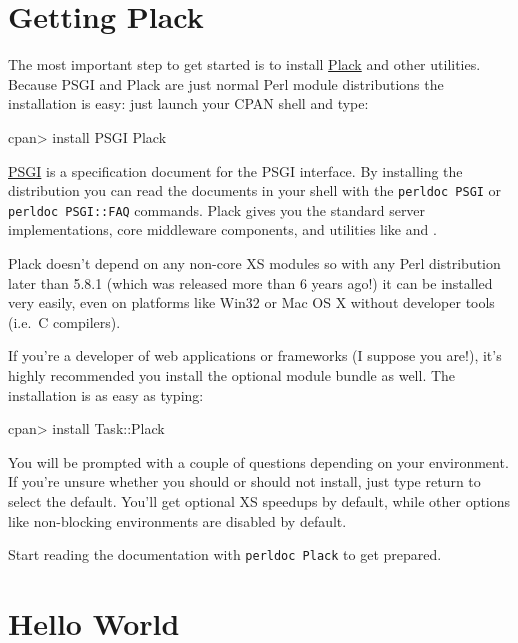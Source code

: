 \chapter{Getting Plack}\label{day-1-getting-plack}

The most important step to get started is to install
\href{http://search.cpan.org/dist/Plack}{Plack} and other utilities.
Because PSGI and Plack are just normal Perl module distributions the
installation is easy: just launch your CPAN shell and type:

\begin{shell}
cpan> install PSGI Plack
\end{shell}

\href{http://search.cpan.org/dist/PSGI}{PSGI} is a specification
document for the PSGI interface. By installing the distribution you can
read the documents in your shell with the \lstinline!perldoc PSGI! or
\lstinline!perldoc PSGI::FAQ! commands. Plack gives you the standard
server implementations, core middleware components, and utilities like
 and .

Plack doesn't depend on any non-core XS modules so with any Perl
distribution later than 5.8.1 (which was released more than 6 years
ago!) it can be installed very easily, even on platforms like Win32 or
Mac OS X without developer tools (i.e.~C compilers).

If you're a developer of web applications or frameworks (I suppose you
are!), it's highly recommended you install the optional module bundle
\href{http://search.cpan.org/dist/Task-Plack}{} as well. The
installation is as easy as typing:

\begin{shell}
cpan> install Task::Plack
\end{shell}

You will be prompted with a couple of questions depending on your
environment. If you're unsure whether you should or should not install,
just type return to select the default. You'll get optional XS speedups
by default, while other options like non-blocking environments are
disabled by default.

Start reading the documentation with \lstinline!perldoc Plack! to get
prepared.

\chapter{Hello World}\label{day-2-hello-world}

